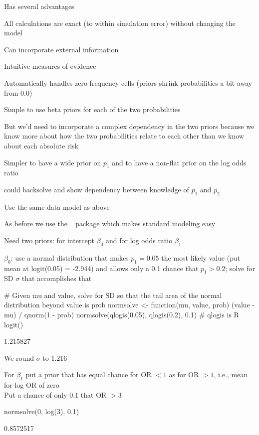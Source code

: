 \bi
\item Has several advantages
 \bi
 \item All calculations are exact (to within simulation error) without changing the model
 \item Can incorporate external information
 \item Intuitive measures of evidence
 \item Automatically handles zero-frequency cells (priors shrink probabilities a bit away from 0.0)
 \ei
\item Simple to use beta priors for each of the two probabilities
\item But we'd need to incorporate a complex dependency in the two priors because we know more about how the two probabilities relate to each other than we know about each absolute risk
\item Simpler to have a wide prior on $p_1$ and to have a non-flat prior on the log odds ratio
  \bi
  \item could backsolve and show dependency between knowledge of $p_1$ and $p_2$
  \ei
\item Use the same data model as above
\item As before we use the \R\  package which makes standard modeling easy
\item Need two priors: for intercept $\beta_0$ and for log odds ratio $\beta_1$
\item $\beta_0$: use a normal distribution that makes $p_1 = 0.05$ the most likely value (put mean at logit(0.05) = -2.944) and allows only a 0.1 chance that $p_1 > 0.2$; solve for SD $\sigma$ that accomplishes that
\begin{Schunk}
\begin{Sinput}
# Given mu and value, solve for SD so that the tail area of the normal distribution beyond value is prob
normsolve <- function(mu, value, prob) (value - mu) / qnorm(1 - prob)
normsolve(qlogis(0.05), qlogis(0.2), 0.1)  # qlogis is R logit()
\end{Sinput}
\begin{Soutput}
[1] 1.215827
\end{Soutput}
\end{Schunk}
\item We round $\sigma$ to 1.216
\item For $\beta_1$ put a prior that has equal chance for OR $< 1$ as for OR $> 1$, i.e., mean for log OR of zero\\
  Put a chance of only 0.1 that OR $> 3$
\begin{Schunk}
\begin{Sinput}
normsolve(0, log(3), 0.1)
\end{Sinput}
\begin{Soutput}
[1] 0.8572517
\end{Soutput}
\end{Schunk}
